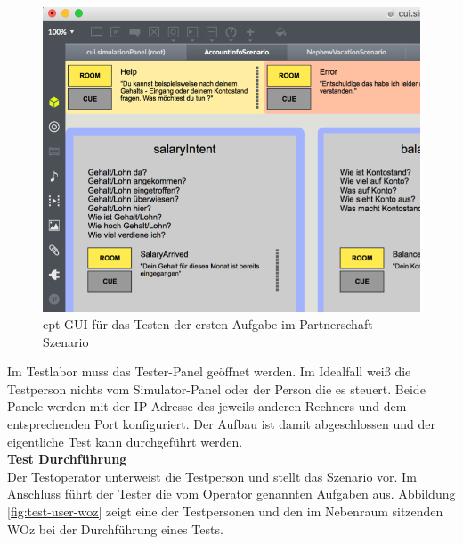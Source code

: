 \begin{figure}[!htb]
    \centering
    \includegraphics[width=1.0\textwidth]{bilder/3_cptGui.png}
    \caption{cpt GUI für das Testen der ersten Aufgabe im Partnerschaft Szenario}
    \label{fig:cpt-gui}
\end{figure}

Im Testlabor muss das Tester-Panel geöffnet werden. Im Idealfall weiß die Testperson nichts vom Simulator-Panel oder der Person die es steuert. Beide Panele werden mit der \ac{IP}-Adresse des jeweils anderen Rechners und dem entsprechenden Port konfiguriert. Der Aufbau ist damit abgeschlossen und der eigentliche Test kann durchgeführt werden.\\

\textbf{Test Durchführung}\\
Der Testoperator unterweist die Testperson und stellt das Szenario vor. Im Anschluss führt der Tester die vom Operator genannten Aufgaben aus. Abbildung \ref{fig:test-user-woz} zeigt eine der Testpersonen und den im Nebenraum sitzenden \ac{WOz} bei der Durchführung eines Tests.

